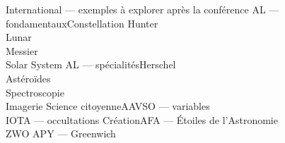 \documentclass[aspectratio=169]{beamer}
\begin{document}
\begin{frame}{International — exemples à explorer après la conférence}
  \SwissAstroOpenFour
    {AL — fondamentaux}{Constellation Hunter\\Lunar\\Messier\\Solar System}
    {AL — spécialités}{Herschel\\Astéroïdes\\Spectroscopie\\Imagerie}
    {Science citoyenne}{AAVSO — variables\\IOTA — occultations}
    {Création}{AFA — Étoiles de l'Astronomie\\ZWO APY — Greenwich}
\end{frame}
\end{document}

